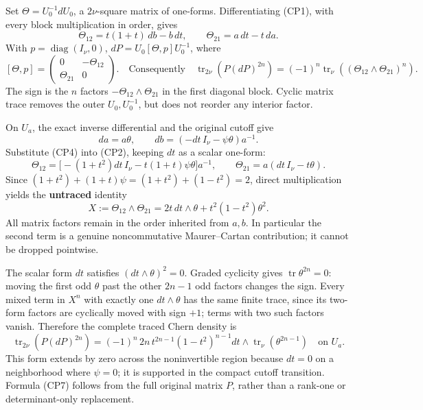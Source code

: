 \documentclass[
  11pt,
]{article}
\begin{document}
Set \(\Theta=U_0^{-1}dU_0\), a \(2\nu\)-square matrix of one-forms.
Differentiating (CP1), with every block multiplication in order, gives
\[
 \Theta_{12}=t(1+t)\,db-b\,dt,\qquad
 \Theta_{21}=a\,dt-t\,da.
 \tag{CP2}
\] With \(p=\operatorname{diag}(I_\nu,0)\),
\(dP=U_0[\Theta,p]U_0^{-1}\), where \[
 [\Theta,p]=
 \begin{pmatrix}0&-\Theta_{12}\\\Theta_{21}&0\end{pmatrix}.
 \quad\text{Consequently}\quad
 \operatorname{tr}_{2\nu}\!\left(P(dP)^{2n}\right)
   =(-1)^n\operatorname{tr}_{\nu}
        \left((\Theta_{12}\wedge\Theta_{21})^n\right).
 \tag{CP3}
\] The sign is the \(n\) factors \(-\Theta_{12}\wedge\Theta_{21}\) in
the first diagonal block. Cyclic matrix trace removes the outer
\(U_0,U_0^{-1}\), but does not reorder any interior factor.

On \(U_a\), the exact inverse differential and the original cutoff give
\[
 da=a\theta,\qquad
 db=(-dt\,I_\nu-\psi\theta)a^{-1}.
 \tag{CP4}
\] Substitute (CP4) into (CP2), keeping \(dt\) as a scalar one-form: \[
 \Theta_{12}
   =\bigl[-(1+t^2)dt\,I_\nu-t(1+t)\psi\theta\bigr]a^{-1},
 \qquad
 \Theta_{21}=a(dt\,I_\nu-t\theta).
 \tag{CP5}
\] Since \((1+t^2)+(1+t)\psi=(1+t^2)+(1-t^2)=2\), direct multiplication
yields the \textbf{untraced} identity \[
 X:=\Theta_{12}\wedge\Theta_{21}
     =2t\,dt\wedge\theta+t^2(1-t^2)\theta^2.
 \tag{CP6}
\] All matrix factors remain in the order inherited from \(a,b\). In
particular the second term is a genuine noncommutative Maurer--Cartan
contribution; it cannot be dropped pointwise.

The scalar form \(dt\) satisfies \((dt\wedge\theta)^2=0\). Graded
cyclicity gives \(\operatorname{tr}\theta^{2n}=0\): moving the first odd
\(\theta\) past the other \(2n-1\) odd factors changes the sign. Every
mixed term in \(X^n\) with exactly one \(dt\wedge\theta\) has the same
finite trace, since its two-form factors are cyclically moved with sign
\(+1\); terms with two such factors vanish. Therefore the complete
traced Chern density is \[
 \operatorname{tr}_{2\nu}\!\left(P(dP)^{2n}\right)
 =(-1)^n\,2n\,t^{2n-1}(1-t^2)^{n-1}
     dt\wedge\operatorname{tr}_\nu(\theta^{2n-1})
 \quad\text{on }U_a.
 \tag{CP7}
\] This form extends by zero across the noninvertible region because
\(dt=0\) on a neighborhood where \(\psi=0\); it is supported in the
compact cutoff transition. Formula (CP7) follows from the full original
matrix \(P\), rather than a rank-one or determinant-only replacement.
\end{document}
